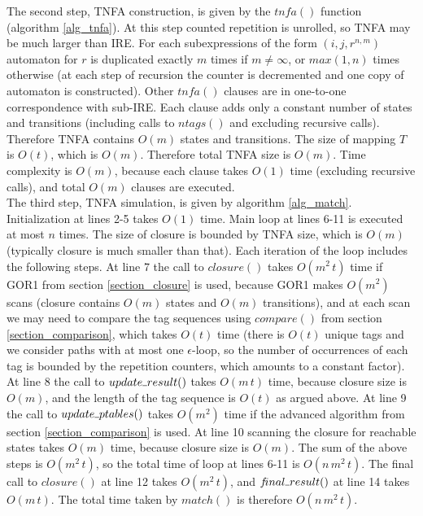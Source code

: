 \documentclass[AMA,STIX1COL]{WileyNJD-v2}
\newcommand{\Xund}{\rule{.4em}{.4pt}}
\begin{document}
The second step, TNFA construction, is given by the $tn\!f\!a()$ function (algorithm \ref{alg_tnfa}).
At this step counted repetition is unrolled, so TNFA may be much larger than IRE.
For each subexpressions of the form $(i, j, r^{n,m})$ automaton for $r$ is duplicated exactly $m$ times if $m \neq \infty$, or $max(1, n)$ times otherwise
(at each step of recursion the counter is decremented and one copy of automaton is constructed).
Other $tn\!f\!a()$ clauses are in one-to-one correspondence with sub-IRE.
Each clause adds only a constant number of states and transitions (including calls to $ntags()$ and excluding recursive calls).
Therefore TNFA contains $O(m)$ states and transitions.
The size of mapping $T$ is $O(t)$, which is $O(m)$.
Therefore total TNFA size is $O(m)$.
Time complexity is $O(m)$, because each clause takes $O(1)$ time (excluding recursive calls), and total $O(m)$ clauses are executed.
\\

The third step, TNFA simulation, is given by algorithm \ref{alg_match}.
Initialization at lines 2-5 takes $O(1)$ time.
Main loop at lines 6-11 is executed at most $n$ times.
The size of closure is bounded by TNFA size, which is $O(m)$ (typically closure is much smaller than that).
Each iteration of the loop includes the following steps.
%
At line 7 the call to $closure()$ takes $O(m^2 \, t)$ time if GOR1 from section \ref{section_closure} is used,
because GOR1 makes $O(m^2)$ scans (closure contains $O(m)$ states and $O(m)$ transitions),
and at each scan we may need to compare the tag sequences using $compare()$ from section \ref{section_comparison},
which takes $O(t)$ time
(there is $O(t)$ unique tags and we consider paths with at most one $\epsilon$-loop,
so the number of occurrences of each tag is bounded by the repetition counters,
which amounts to a constant factor).
%
At line 8 the call to $update \Xund result()$ takes $O(m \, t)$ time,
because closure size is $O(m)$,
and the length of the tag sequence is $O(t)$ as argued above.
%
At line 9 the call to $update \Xund ptables ()$ takes $O(m^2)$ time
if the advanced algorithm from section \ref{section_comparison} is used.
%
At line 10 scanning the closure for reachable states takes $O(m)$ time,
because closure size is $O(m)$.
%
The sum of the above steps is $O(m^2 \, t)$, so the total time of loop at lines 6-11 is $O(n \, m^2 \, t)$.
The final call to $closure()$ at line 12 takes $O(m^2 \, t)$,
and $f\!inal \Xund result ()$ at line 14 takes $O(m \, t)$.
The total time taken by $match()$ is therefore $O(n \, m^2 \, t)$.
\\
\end{document}
